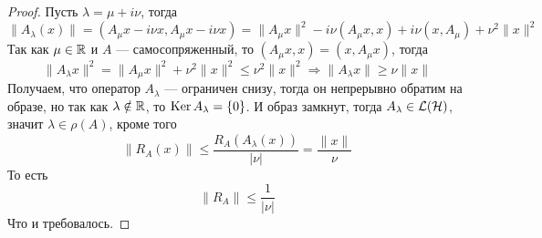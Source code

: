 \begin{proof}
	Пусть $\lambda = \mu + i \nu$, тогда 
	$$
	\|A_\lambda(x)\| = (A_\mu x - i\nu x, A_\mu x - i\nu x) = \|A_\mu x\|^2 - i\nu(A_\mu x, x) + i\nu (x, A_\mu) + \nu^2 \|x\|^2
	$$
	Так как $\mu \in \mathbb{R}$ и $A$ --- самосопряженный, то $(A_\mu x, x) = (x, A_\mu x)$, тогда 
	$$
	\|A_\lambda x\|^2 = \|A_\mu x\|^2 + \nu^2 \|x\|^2\leq \nu^2 \|x\|^2 \Rightarrow \|A_\lambda x\| \geq \nu \|x\|
	$$
	Получаем, что оператор $A_\lambda$ --- ограничен снизу, тогда он непрерывно обратим на образе, но так как $\lambda \notin \mathbb{R}$, то $\operatorname{Ker} A_\lambda = \{0\}$. И образ замкнут, тогда $A_\lambda \in \mathcal{L}(\mathcal{H})$, значит $\lambda \in \rho(A)$, кроме того 
	$$
	\|R_A(x)\| \leq \frac{R_A(A_\lambda(x))}{|\nu|} = \frac{\|x\|}{\nu}
	$$ 
	То есть 
	$$
	\|R_A\| \leq \frac{1}{|\nu|}
	$$
	Что и требовалось.
\end{proof}
